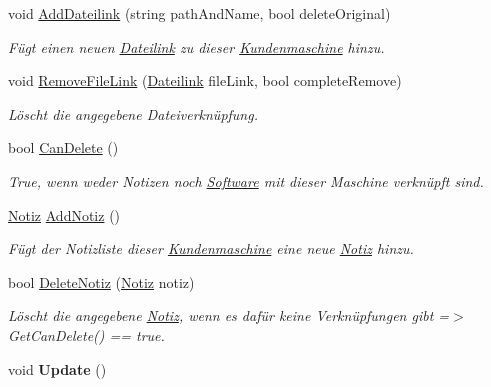 \begin{DoxyCompactItemize}
void \hyperlink{class_products_1_1_model_1_1_entities_1_1_kundenmaschine_aa7e975f0a547e8828900f59d90a9feb4}{Add\+Dateilink} (string path\+And\+Name, bool delete\+Original)
\begin{DoxyCompactList}\small\item\em Fügt einen neuen \hyperlink{class_products_1_1_model_1_1_entities_1_1_dateilink}{Dateilink} zu dieser \hyperlink{class_products_1_1_model_1_1_entities_1_1_kundenmaschine}{Kundenmaschine} hinzu. \end{DoxyCompactList}\item 
void \hyperlink{class_products_1_1_model_1_1_entities_1_1_kundenmaschine_ab9815891e6bbcce9c896cfabc6e5b154}{Remove\+File\+Link} (\hyperlink{class_products_1_1_model_1_1_entities_1_1_dateilink}{Dateilink} file\+Link, bool complete\+Remove)
\begin{DoxyCompactList}\small\item\em Löscht die angegebene Dateiverknüpfung. \end{DoxyCompactList}\item 
bool \hyperlink{class_products_1_1_model_1_1_entities_1_1_kundenmaschine_a7ccbdc5dc80e345295094637406dae84}{Can\+Delete} ()
\begin{DoxyCompactList}\small\item\em True, wenn weder Notizen noch \hyperlink{class_products_1_1_model_1_1_entities_1_1_software}{Software} mit dieser Maschine verknüpft sind. \end{DoxyCompactList}\item 
\hyperlink{class_products_1_1_model_1_1_entities_1_1_notiz}{Notiz} \hyperlink{class_products_1_1_model_1_1_entities_1_1_kundenmaschine_a415e48e8b111697334e23a79873ac79c}{Add\+Notiz} ()
\begin{DoxyCompactList}\small\item\em Fügt der Notizliste dieser \hyperlink{class_products_1_1_model_1_1_entities_1_1_kundenmaschine}{Kundenmaschine} eine neue \hyperlink{class_products_1_1_model_1_1_entities_1_1_notiz}{Notiz} hinzu. \end{DoxyCompactList}\item 
bool \hyperlink{class_products_1_1_model_1_1_entities_1_1_kundenmaschine_a4b711d212c63f1213588dd049692ae32}{Delete\+Notiz} (\hyperlink{class_products_1_1_model_1_1_entities_1_1_notiz}{Notiz} notiz)
\begin{DoxyCompactList}\small\item\em Löscht die angegebene \hyperlink{class_products_1_1_model_1_1_entities_1_1_notiz}{Notiz}, wenn es dafür keine Verknüpfungen gibt =$>$ Get\+Can\+Delete() == true. \end{DoxyCompactList}\item 
void {\bfseries Update} ()\hypertarget{class_products_1_1_model_1_1_entities_1_1_kundenmaschine_ab499b8624512d97e70dc83d59319d08a}{}\label{class_products_1_1_model_1_1_entities_1_1_kundenmaschine_ab499b8624512d97e70dc83d59319d08a}

\end{DoxyCompactItemize}
